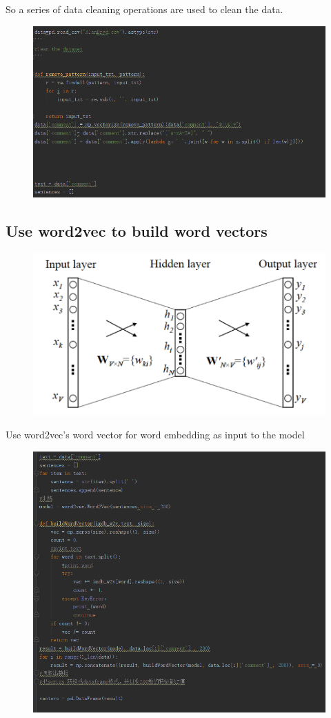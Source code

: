 \documentclass{article}
\begin{document}
So a series of data cleaning operations are used to clean the data.
 \begin{figure}[H]
\centering
  \includegraphics[width=.8\textwidth]{3-3.png} %
  \end{figure}
\subsection{Use word2vec to build word vectors}
 \begin{figure}[H]
\centering
  \includegraphics[width=.8\textwidth]{3-4.png} %
  \end{figure}
Use word2vec's word vector for word embedding as input to the model
 \begin{figure}[H]
\centering
  \includegraphics[width=.8\textwidth]{3-5.png} %
  \end{figure}
\end{document}
